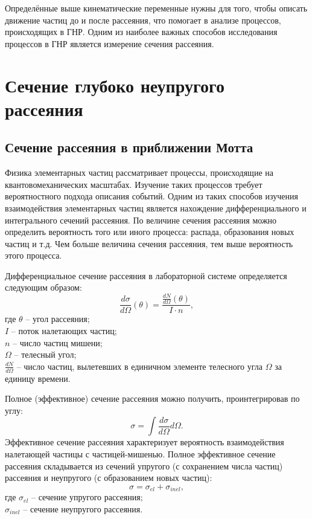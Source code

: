 \documentclass{extreport}
\begin{document}
Определённые выше кинематические переменные нужны для того, чтобы описать движение частиц до и после рассеяния, что помогает в анализе процессов, происходящих в ГНР. Одним из наиболее важных способов исследования процессов в ГНР является измерение сечения рассеяния. 
\section{Сечение глубоко неупругого рассеяния}
\subsection{Сечение рассеяния в приближении Мотта}
Физика элементарных частиц рассматривает процессы, происходящие на квантовомеханических масштабах. Изучение таких процессов требует вероятностного подхода описания событий. Одним из таких способов изучения взаимодействия элементарных частиц является нахождение дифференциального и интегрального сечений рассеяния. По величине сечения рассеяния можно определить вероятность того или иного процесса: распада, образования новых частиц и т.д. Чем больше величина сечения рассеяния, тем выше вероятность этого процесса.

Дифференциальное сечение рассеяния в лабораторной системе определяется следующим образом:
\begin{equation}
    \frac{d\sigma}{d\Omega}(\theta) = \frac{\frac{dN}{d\Omega}(\theta)}{I \cdot n},
\end{equation}
где $\theta$ -- угол рассеяния; \\ $I$ -- поток налетающих частиц; \\ $n$ -- число частиц мишени; \\ $\Omega$ -- телесный угол; \\ $\frac{dN}{d\Omega}$ -- число частиц, вылетевших в единичном элементе телесного угла $\Omega$ за единицу времени.

Полное (эффективное) сечение рассеяния можно получить, проинтегрировав по углу:
\begin{equation}
    \sigma = \int \frac{d\sigma}{d\Omega}d\Omega. 
\end{equation}
Эффективное сечение рассеяния характеризует вероятность взаимодействия налетающей частицы с частицей-мишенью. Полное эффективное сечение рассеяния складывается из сечений упругого (с сохранением числа частиц) рассеяния и неупругого (с образованием новых частиц):
\begin{equation}
    \sigma = \sigma_{el} + \sigma_{inel},
\end{equation}
где $\sigma_{el}$ -- сечение упругого рассеяния; \\ $\sigma_{inel}$ -- сечение неупругого рассеяния. 
\end{document}

